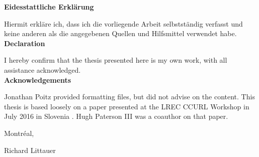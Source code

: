 \documentclass[12pt,a4paper]{article}
\begin{document}


\newpage

\thispagestyle{empty}
\noindent\textbf{Eidesstattliche Erkl\"arung}

\noindent Hiermit erkl\"are ich, dass ich die vorliegende Arbeit selbstst\"andig verfasst und keine anderen als die angegebenen Quellen und Hilfsmittel verwendet habe.\\

\noindent\textbf{Declaration}

\noindent I hereby confirm that the thesis presented here is my own work, with all assistance acknowledged. \\

\noindent\textbf{Acknowledgements}

\noindent Jonathan Poitz provided formatting files, but did not advise on the content. This thesis is based loosely on a paper presented at the LREC CCURL Workshop in July 2016 in Slovenia \citep{CCURL}. Hugh Paterson III was a coauthor on that paper.

\vspace{1cm}

\noindent Montr\'eal, \thedate

\vspace{1.7cm}

\noindent Richard Littauer


\newpage
%
\tableofcontents
\thispagestyle{empty}

\newpage


\setcounter{page}{1}
\end{document}

